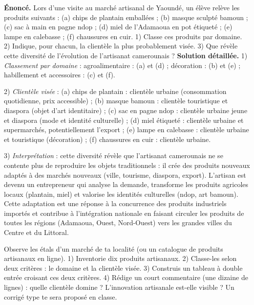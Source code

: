 \documentclass[11pt]{article}
\newcommand{\cle}[1]{{\popxbold\color{popdark}#1}}
\begin{document}
\begin{exoresolu}
\textbf{\'Enonc\'e.} Lors d'une visite au march\'e artisanal de Yaound\'e, un \'el\`eve rel\`eve les produits suivants : (a) chips de plantain emball\'ees ; (b) masque sculpt\'e bamoun ; (c) sac \`a main en pagne ndop ; (d) miel de l'Adamaoua en pot \'etiquet\'e ; (e) lampe en calebasse ; (f) chaussures en cuir. 1) Classe ces produits par domaine. 2) Indique, pour chacun, la client\`ele la plus probablement vis\'ee. 3) Que r\'ev\`ele cette diversit\'e de l'\'evolution de l'artisanat camerounais ?
\tcblower
\textbf{Solution d\'etaill\'ee.}
1) \emph{Classement par domaine} : agroalimentaire : (a) et (d) ; d\'ecoration : (b) et (e) ; habillement et accessoires : (c) et (f).

2) \emph{Client\`ele vis\'ee} : (a) chips de plantain : client\`ele urbaine (consommation quotidienne, prix accessible) ; (b) masque bamoun : client\`ele touristique et diaspora (objet d'art identitaire) ; (c) sac en pagne ndop : client\`ele urbaine jeune et diaspora (mode et identit\'e culturelle) ; (d) miel \'etiquet\'e : client\`ele urbaine et supermarch\'es, potentiellement l'export ; (e) lampe en calebasse : client\`ele urbaine et touristique (d\'ecoration) ; (f) chaussures en cuir : client\`ele urbaine.

3) \emph{Interpr\'etation} : cette diversit\'e r\'ev\`ele que l'artisanat camerounais ne se contente plus de reproduire les objets traditionnels : il cr\'ee des \cle{produits nouveaux} adapt\'es \`a des \cle{march\'es nouveaux} (ville, tourisme, diaspora, export). L'artisan est devenu un entrepreneur qui analyse la demande, transforme les produits agricoles locaux (plantain, miel) et valorise les identit\'es culturelles (ndop, art bamoun). Cette adaptation est une r\'eponse \`a la concurrence des produits industriels import\'es et contribue \`a l'int\'egration nationale en faisant circuler les produits de toutes les r\'egions (Adamaoua, Ouest, Nord-Ouest) vers les grandes villes du Centre et du Littoral.
\end{exoresolu}

\begin{exercice}
Observe les \'etals d'un march\'e de ta localit\'e (ou un catalogue de produits artisanaux en ligne). 1) Inventorie dix produits artisanaux. 2) Classe-les selon deux crit\`eres : le domaine et la client\`ele vis\'ee. 3) Construis un tableau \`a double entr\'ee croisant ces deux crit\`eres. 4) R\'edige un court commentaire (une dizaine de lignes) : quelle client\`ele domine ? L'innovation artisanale est-elle visible ? Un corrig\'e type te sera propos\'e en classe.
\end{exercice}
\end{document}
